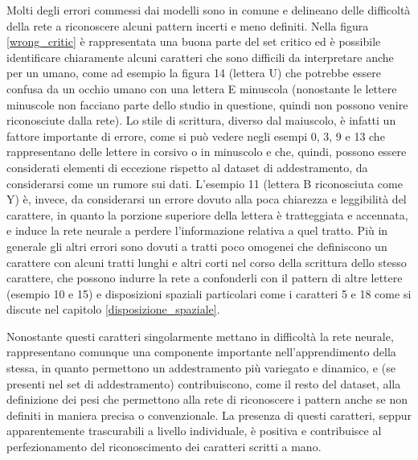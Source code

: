 \documentclass[a4paper,12pt]{article}
\begin{document}
Molti degli errori commessi dai modelli sono in comune e delineano delle difficoltà della rete a riconoscere alcuni pattern incerti e meno definiti. Nella figura \ref{wrong_critic} è rappresentata una buona parte del set critico ed è possibile identificare chiaramente alcuni caratteri che sono difficili da interpretare anche per un umano, come ad esempio la figura 14 (lettera U) che potrebbe essere confusa da un occhio umano con una lettera E minuscola (nonostante le lettere minuscole non facciano parte dello studio in questione, quindi non possono venire riconosciute dalla rete). Lo stile di scrittura, diverso dal maiuscolo, è infatti un fattore importante di errore, come si può vedere negli esempi 0, 3, 9 e 13 che rappresentano delle lettere in corsivo o in minuscolo e che, quindi, possono essere considerati elementi di eccezione rispetto al dataset di addestramento, da considerarsi come un rumore sui dati.
L'esempio 11 (lettera B riconosciuta come Y) è, invece, da considerarsi un errore dovuto alla poca chiarezza e leggibilità del carattere, in quanto la porzione superiore della lettera è tratteggiata e accennata, e induce la rete neurale a perdere l'informazione relativa a quel tratto.
Più in generale gli altri errori sono dovuti a tratti poco omogenei che definiscono un carattere con alcuni tratti lunghi e altri corti nel corso della scrittura dello stesso carattere, che possono indurre la rete a confonderli con il pattern di altre lettere (esempio 10 e 15) e disposizioni spaziali particolari come i caratteri 5 e 18 come si discute nel capitolo \ref{disposizione_spaziale}.

Nonostante questi caratteri singolarmente mettano in difficoltà la rete neurale, rappresentano comunque una componente importante nell'apprendimento della stessa, in quanto permettono un addestramento più variegato e dinamico, e (se presenti nel set di addestramento) contribuiscono, come il resto del dataset, alla definizione dei pesi che permettono alla rete di riconoscere i pattern anche se non definiti in maniera precisa o convenzionale. La presenza di questi caratteri, seppur apparentemente trascurabili a livello individuale, è positiva e contribuisce al perfezionamento del riconoscimento dei caratteri scritti a mano.
\end{document}
